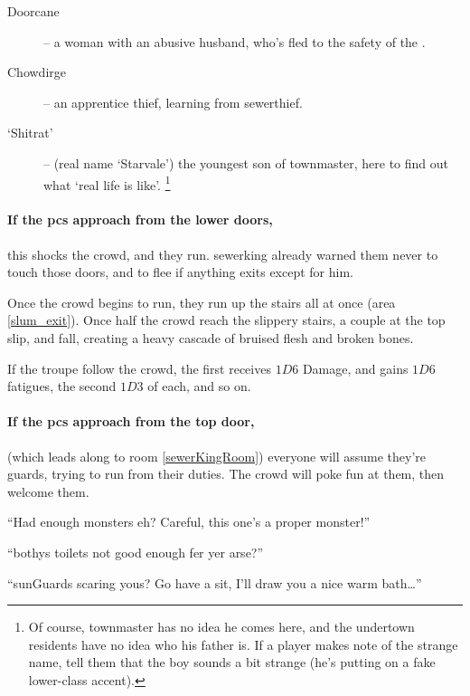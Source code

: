 \begin{description}
  \item[Doorcane] -- a woman with an abusive husband, who's fled to the safety of the .
  \item[Chowdirge] -- an apprentice thief, learning from \gls{sewerthief}.
  \item[`Shitrat'] -- (real name `Starvale') the youngest son of \gls{townmaster}, here to find out what `real life is like'.%
  \footnote{Of course, \gls{townmaster} has no idea he comes here, and the undertown residents have no idea who his father is.  If a player makes note of the strange name, tell them that the boy sounds a bit strange (he's putting on a fake lower-class accent).}
\end{description}

\paragraph{If the \glspl{pc} approach from the lower doors,}
this shocks the crowd, and they run.
\Gls{sewerking} already warned them never to touch those doors, and to flee if anything exits except for him.

Once the crowd begins to run, they run up the stairs all at once (area \vref{slum_exit}).
Once half the crowd reach the slippery stairs, a couple at the top slip, and fall, creating a heavy cascade of bruised flesh and broken bones.

If the troupe follow the crowd, the first receives $1D6$ Damage, and gains $1D6$ \glspl{fatigue}, the second $1D3$ of each, and so on.

\paragraph{If the \glspl{pc} approach from the top door,}
(which leads along to room \ref{sewerKingRoom}) everyone will assume they're \glspl{guard}, trying to run from their duties.
The crowd will poke fun at them, then welcome them.

\begin{speechtext}

  ``Had enough monsters eh?
  Careful, this one's a proper monster!''

  ``\Glspl{bothy} toilets not good enough fer yer arse?''

  ``\Glspl{sunGuard} scaring yous?
  Go have a sit, I'll draw you a nice warm bath\ldots''
\end{speechtext}

